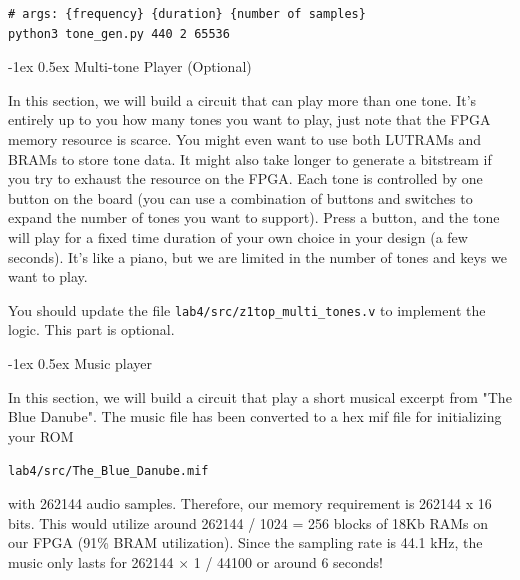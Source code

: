 \documentclass[11pt]{article}
\makeatletter
\renewcommand{\subsection}
{\@startsection {subsection}{1}{0pt}
 {-1ex}
 {0.5ex}
 {\bfseries\normalsize}}
\makeatother
\begin{document}
\begin{verbatim}
# args: {frequency} {duration} {number of samples}
python3 tone_gen.py 440 2 65536
\end{verbatim}

\subsection{Multi-tone Player (Optional)}

In this section, we will build a circuit that can play more than one tone. It's entirely up to you how many tones you want to play, just note that the FPGA memory resource is scarce. You might even want to use both LUTRAMs and BRAMs to store tone data. It might also take longer to generate a bitstream if you try to exhaust the resource on the FPGA. Each tone is controlled by one button on the board (you can use a combination of buttons and switches to expand the number of tones you want to support). Press a button, and the tone will play for a fixed time duration of your own choice in your design (a few seconds). It's like a piano, but we are limited in the number of tones and keys we want to play.

You should update the file \verb|lab4/src/z1top_multi_tones.v| to implement the logic. This part is optional.

\subsection{Music player}

In this section, we will build a circuit that play a short musical excerpt from "The Blue Danube". The music file has been converted to a hex mif file for initializing your ROM

\verb|lab4/src/The_Blue_Danube.mif|

with 262144 audio samples. Therefore, our memory requirement is 262144 x 16 bits. This would utilize around 262144 / 1024 = 256 blocks of 18Kb RAMs on our FPGA (91\% BRAM utilization). Since the sampling rate is 44.1 kHz, the music only lasts for 262144 $\times$ 1 / 44100 or around 6 seconds!
\end{document}
